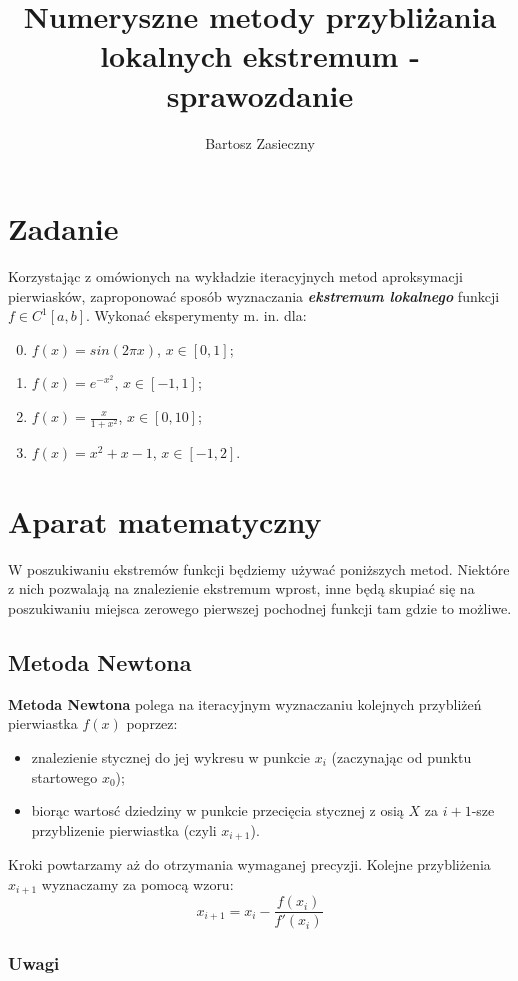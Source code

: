 \documentclass[a4paper,11pt]{article}
\title{Numeryszne metody przybliżania lokalnych ekstremum - sprawozdanie}
\author{Bartosz Zasieczny}
\begin{document}
\maketitle
\tableofcontents

\section{Zadanie}
Korzystając z omówionych na wykładzie iteracyjnych metod aproksymacji pierwiasków, zaproponować sposób wyznaczania \textbf{\emph{ekstremum lokalnego}} funkcji \( f \in C^1[a,b] \). Wykonać eksperymenty m. in. dla:
\begin{enumerate}
  \setcounter{enumi}{-1}
  \item \( f(x) = sin(2 \pi x) \), \( x \in [0,1] \); 
  \item \( f(x) = e^{-x^2} \), \( x \in [-1, 1] \); 
  \item\( f(x) = \frac {x} {1+x^2} \), \( x \in [0,10] \); 
  \item\( f(x) = x^2 + x - 1 \), \( x \in [-1,2] \).
\end{enumerate}

\section{Aparat matematyczny}
  W poszukiwaniu ekstremów funkcji będziemy używać poniższych metod. Niektóre z nich pozwalają na znalezienie ekstremum wprost, inne będą skupiać się na poszukiwaniu miejsca zerowego pierwszej pochodnej funkcji tam gdzie to możliwe.
  \subsection{Metoda Newtona}
  \textbf{Metoda Newtona} polega na iteracyjnym wyznaczaniu kolejnych przybliżeń pierwiastka \( f(x) \) poprzez: 
  \begin{itemize}
    \item znalezienie stycznej do jej wykresu w punkcie \(x_i\) (zaczynając od punktu startowego \(x_0\)); 
    \item biorąc wartosć dziedziny w punkcie przecięcia stycznej z osią \(X\) za \(i+1\)-sze przyblizenie pierwiastka (czyli \( x_{i+1} \)).
  \end{itemize}
  Kroki powtarzamy aż do otrzymania wymaganej precyzji.
  Kolejne przybliżenia \( x_{i+1} \) wyznaczamy za pomocą wzoru:
  $$ x_{i+1} = x_i - \frac {f(x_i)} {f'(x_i)} $$
  \subsubsection{Uwagi}
  
\end{document}

